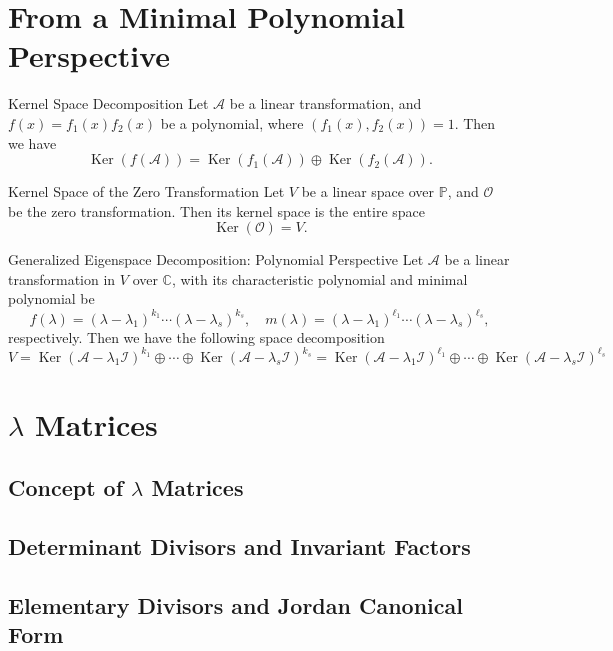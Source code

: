 \section{From a Minimal Polynomial Perspective}


\begin{theorem}{Kernel Space Decomposition}{}
  Let $\mathcal{A}$ be a linear transformation,
  and $f(x) = f_1(x) f_2(x)$ be a polynomial,
  where $(f_1(x), f_2(x)) = 1$.
  Then we have
  \begin{equation}
    \operatorname{Ker}(f(\mathcal{A}))
    = \operatorname{Ker}(f_1(\mathcal{A})) \oplus \operatorname{Ker}(f_2(\mathcal{A})).
  \end{equation}
\end{theorem}

\begin{lemma}{Kernel Space of the Zero Transformation}{}
  Let $V$ be a linear space over $\mathbb{P}$,
  and $\mathcal{O}$ be the zero transformation.
  Then its kernel space is the entire space
  \begin{equation}
    \operatorname{Ker}(\mathcal{O}) = V.
  \end{equation}
\end{lemma}

\begin{theorem}{Generalized Eigenspace Decomposition: Polynomial Perspective}{}
  Let $\mathcal{A}$ be a linear transformation in $V$ over $\mathbb{C}$,
  with its characteristic polynomial and minimal polynomial be
  \begin{equation}
    f(\lambda) = (\lambda - \lambda_1)^{k_1} \cdots (\lambda - \lambda_s)^{k_s}, \quad
    m(\lambda) = (\lambda - \lambda_1)^{\ell_1} \cdots (\lambda - \lambda_s)^{\ell_s},
  \end{equation}
  respectively. Then we have the following space decomposition
  \begin{equation}
    V = \operatorname{Ker} (\mathcal{A} - \lambda_1 \mathcal{I})^{k_1} \oplus
    \cdots \oplus \operatorname{Ker}(\mathcal{A} - \lambda_s \mathcal{I})^{k_s}
    = \operatorname{Ker}(\mathcal{A} - \lambda_1 \mathcal{I})^{\ell_1} \oplus
    \cdots \oplus \operatorname{Ker}(\mathcal{A} - \lambda_s \mathcal{I})^{\ell_s}
  \end{equation}
\end{theorem}

\section{$\lambda$ Matrices}

\subsection{Concept of $\lambda$ Matrices}

\subsection{Determinant Divisors and Invariant Factors}

\subsection{Elementary Divisors and Jordan Canonical Form}



